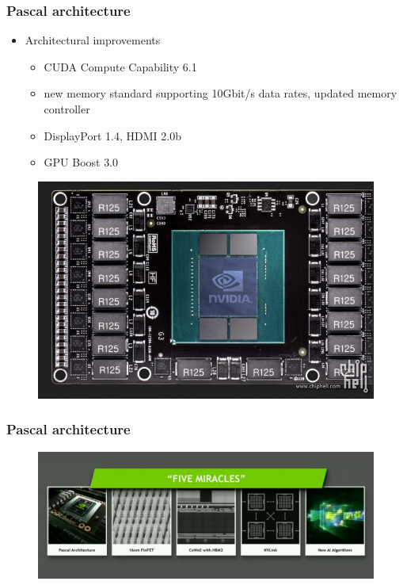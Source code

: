 \documentclass{beamer}
\begin{document}
\begin{frame}
\frametitle{Pascal architecture}
\begin{itemize}
	\item Architectural improvements
	\begin{itemize}
		\item {CUDA Compute Capability 6.1}
		\item {new memory standard supporting 10Gbit/s data rates, updated memory controller}
		\item {DisplayPort 1.4, HDMI 2.0b}
		\item {GPU Boost 3.0}
	\end{itemize}
\end{itemize}

\begin{figure}
	\centering
	\includegraphics[scale=0.2]{pascal3}
\end{figure}
\end{frame}
\begin{frame}
\frametitle{Pascal architecture}
\begin{figure}
	\centering
	\includegraphics[scale=0.14]{pascal4}
\end{figure}
\end{frame}
\end{document}
